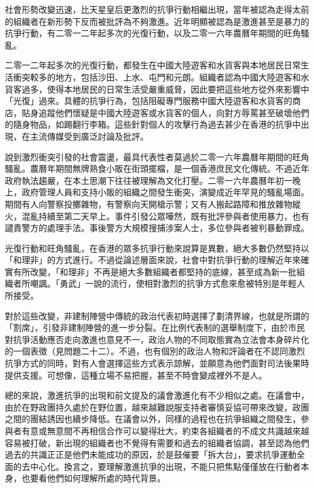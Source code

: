 社會形勢改變迅速，比天星皇后更激烈的抗爭行動相繼出現，當年被認為走得太前的組織者在新形勢下反而被批評為不夠激進。近年明顯被認為是激進甚至是暴力的抗爭行動，有二零一二年起多次的光復行動，以及二零一六年農曆年期間的旺角騷亂。

二零一二年起多次的光復行動，都發生在中國大陸遊客和水貨客與本地居民日常生活衝突較多的地方，包括沙田、上水、屯門和元朗。組織者認為中國大陸遊客和水貨客過多，使得本地居民的日常生活受嚴重威脅，因此要把這些地方從外來影響中「光復」過來。具體的抗爭行為，包括阻礙專門服務中國大陸遊客和水貨客的商店，貼身追蹤他們懷疑是中國大陸遊客或水貨客的個人，向對方辱罵甚至破壞他們的隨身物品，如踢翻行李箱。這些針對個人的攻擊行為過去甚少在香港的抗爭中出現，在主流傳媒受到廣泛討論及批評。

說到激烈衝突引發的社會震盪，最具代表性者莫過於二零一六年農曆年期間的旺角騷亂。農曆年期間無牌熟食小販在街頭擺檔，是一個香港庶民文化傳統。不過近年政府執法趨嚴，在本土思潮下往往被理解為文化打壓。二零一六年農曆年初一晚上，政府管理人員和支持小販的組織之間發生衝突，演變成近年罕見的騷亂場面。期間有人向警察投擲雜物，有警察向天開槍示警；又有人搬起路障和推放雜物縱火，混亂持續至第二天早上。事件引發公眾嘩然，既有批評參與者使用暴力，也有譴責警方的處理手法。事後警方大規模搜捕涉案人士，多位參與者被判暴動罪成。

光復行動和旺角騷亂，在香港的眾多抗爭行動來說算是異數，絕大多數仍然堅持以「和理非」的方式進行。不過從論述層面來說，社會中對抗爭行動的理解近年來確實有所改變，「和理非」不再是絕大多數組織者都堅持的底線，甚至成為新一批組織者所嘲諷。「勇武」一說的流行，使相對激烈的抗爭方式愈來愈被特別是年輕人所接受。

對於這些改變，非建制陣營中傳統的政治代表初時選擇了劃清界線，也就是所謂的「割席」，引發非建制陣營的進一步分裂。在比例代表制的選舉制度下，由於市民對抗爭活動應否走向激進也意見不一，政治人物的不同取態實為立法會本身碎片化的一個表徵（見問題二十二）。不過，也有個別的政治人物和評論者在不認同激烈抗爭方式的同時，對有人會選擇這些方式表示諒解，並願意為他們面對司法後果時提供支援。可想像，這種立場不易把握，甚至不時會變成裡外不是人。

總的來說，激進抗爭的出現和前文提及的議會激進化有不少相似之處。在議會中，由於在野政團持久處於在野位置，越來越難說服支持者審慎妥協可帶來改變，政團之間的團結誘因也續步降低。在議會以外，同樣的過程也在抗爭組織之間發生，參與者有意或無意間不再相信合作可以變得壯大，約束各組織者的不成文共識越來越容易被打破，新出現的組織者也不覺得有需要和過去的組織者協調，甚至認為他們過去的共識正正是他們未能成功的原因，於是鼓催要「拆大台」，要求抗爭運動全面的去中心化。換言之，要理解激進抗爭的出現，不能只把焦點僅僅放在行動者本身，也要看他們如何理解所處的時代背景。

